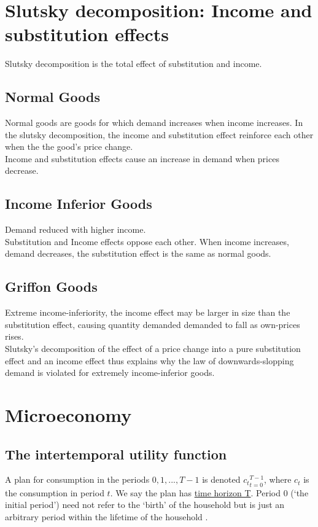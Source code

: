 \documentclass[a4paper, 12pt, reqno]{article}
\begin{document}
\section{Slutsky decomposition: Income and substitution effects}
Slutsky decomposition is the total effect of substitution and income. 

\subsection{Normal Goods}
Normal goods are goods for which demand increases when income increases. 
In the slutsky decomposition, the income and substitution effect reinforce each other when the the good's price change. \\
Income and substitution effects cause an increase in demand when prices decrease. 

\subsection{Income Inferior Goods}
Demand reduced with higher income. \\
Substitution and Income effects oppose each other. When income increases, demand decreases, the substitution effect is the same as normal goods. 

\subsection{Griffon Goods}
Extreme income-inferiority, the income effect may be larger in size than the substitution effect, causing quantity demanded  
demanded to fall as own-prices rises. \\
Slutsky's decomposition of the effect of a price change into a pure substitution effect and an income effect thus explains why the law of downwards-slopping
demand is violated for extremely income-inferior goods.  

\section{Microeconomy}
\subsection{The intertemporal utility function}
A plan for consumption in the periods $0, 1, ... , T-1$ is denoted ${c_t}^{T-1}_{t=0}$, where $c_t$ is the consumption in period $t$. We say the plan has \underline{time horizon T}. 
Period 0 (‘the initial period’) need not refer to the ‘birth’ of the household but is just an arbitrary period within the lifetime of the household . \\
\end{document}
